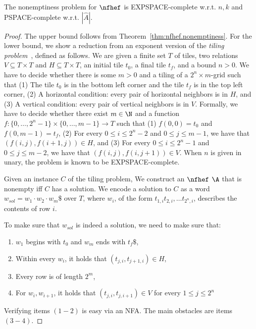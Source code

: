 \begin{theorem}
The nonemptiness problem for $\nfhef$ is EXPSPACE-complete w.r.t. $n,k$ and PSPACE-complete w.r.t. $|\hat A|$.
\end{theorem}
\begin{proof}
The upper bound follows from Theorem~\ref{thm:nfhef.nonemptiness}. 
For the lower bound, we show a reduction from an exponent version of the {\em tiling problem}~\cite{Boas97}, defined as follows.
We are given a finite set $T$ of tiles, two relations $V \subseteq T \times T$ and $H \subseteq T \times T$,
an initial tile $t_0$, a final tile $t_f$, and a bound $n>0$.
We have to decide whether there is some $m>0$ and a tiling of a $2^n \times m$-grid such that
(1) The tile $t_0$ is in the bottom left corner and the tile $t_f$ is in the top left corner,
(2) A horizontal condition: every pair of horizontal neighbors is in $H$, and
(3) A vertical condition: every pair of vertical neighbors is in $V$.
Formally, we have to decide whether there exist $m\in \N$ and a function $f:\{0,\ldots,2^n-1\} \times \{0,\ldots,m-1\} \rightarrow T$
such that
(1) $f(0,0)=t_0$ and $f(0, m-1)=t_f$,
(2) For every $0 \leq i \leq 2^n-2$ and $0 \leq j \leq m-1$, we have that $(f(i,j),f(i+1,j)) \in H$, and
(3) For every $0 \leq i \leq 2^n-1$ and $0 \leq j \leq m-2$, we have that $(f(i,j),f(i,j+1)) \in V$.
When $n$ is given in unary, the problem is known to be EXPSPACE-complete.

Given an instance $C$ of the tiling problem, We construct an $\nfhef$ $\A$ that is nonempty iff $C$ has a solution. 
We encode a solution to $C$ as a word $w_{sol} =w_1\cdot w_2\cdot w_m\$$ over $T$, where $w_i$, of the form $t_{1,i}t_{2,i},\ldots t_{2^n,i}$, describes the contents of row $i$. 

To make sure that $w_{sol}$ is indeed a solution, we need to make sure that:
\begin{enumerate}
\item $w_1$ begins with $t_0$ and $w_m$ ends with $t_f\$$,
\item Within every $w_i$, it holds that $(t_{j,i},t_{j+1,i})\in H$,
    \item Every row is of length $2^m$,
    \item For $w_i,w_{i+1}$, it holds that $(t_{j,i}, t_{j,i+1})\in V$ for every $1\leq j\leq 2^n$
\end{enumerate} 

Verifying items $(1-2)$ is easy via an NFA.  
The main obstacles are items $(3-4)$. 


\end{proof}
